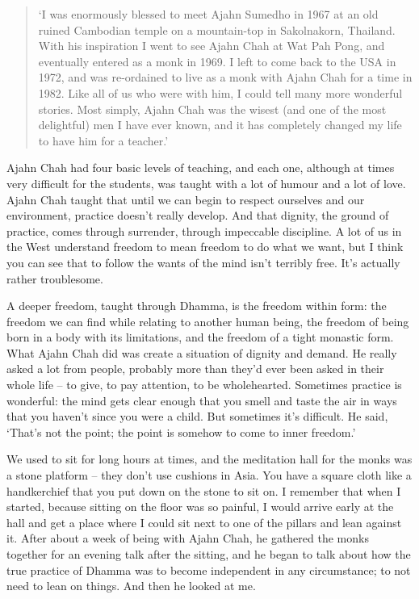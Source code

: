 
\begin{quote}
`I was enormously blessed to meet Ajahn Sumedho in 1967 at
an old ruined Cambodian temple on a mountain-top in Sakolnakorn, 
Thailand. With his inspiration I went to see Ajahn Chah at Wat Pah Pong, 
and eventually entered as a monk in 1969. I left to come back to the USA
in 1972, and was re-ordained to live as a monk with Ajahn Chah for a
time in 1982. Like all of us who were with him, I could tell many more
wonderful stories. Most simply, Ajahn Chah was the wisest (and one of
the most delightful) men I have ever known, and it has completely
changed my life to have him for a teacher.'
\end{quote}

Ajahn Chah had four basic levels of teaching, and each one, although at
times very difficult for the students, was taught with a lot of humour
and a lot of love. Ajahn Chah taught that until we can begin to respect
ourselves and our environment, practice doesn't really develop. And that
dignity, the ground of practice, comes through surrender, through
impeccable discipline. A lot of us in the West understand freedom to
mean freedom to do what we want, but I think you can see that to follow
the wants of the mind isn't terribly free. It's actually rather
troublesome. 

A deeper freedom, taught through Dhamma, is the freedom within form: the
freedom we can find while relating to another human being, the freedom
of being born in a body with its limitations, and the freedom of a tight
monastic form. What Ajahn Chah did was create a situation of dignity and
demand. He really asked a lot from people, probably more than they'd
ever been asked in their whole life -- to give, to pay attention, to be
wholehearted. Sometimes practice is wonderful: the mind gets clear
enough that you smell and taste the air in ways that you haven't since
you were a child. But sometimes it's difficult. He said, `That's not the
point; the point is somehow to come to inner freedom.'

We used to sit for long hours at times, and the meditation hall for the
monks was a stone platform -- they don't use cushions in Asia. You have a
square cloth like a handkerchief that you put down on the stone to sit
on. I remember that when I started, because sitting on the floor was so
painful, I would arrive early at the hall and get a place where I could
sit next to one of the pillars and lean against it. After about a week
of being with Ajahn Chah, he gathered the monks together for an evening
talk after the sitting, and he began to talk about how the true practice
of Dhamma was to become independent in any circumstance; to not need to
lean on things. And then he looked at me. 

